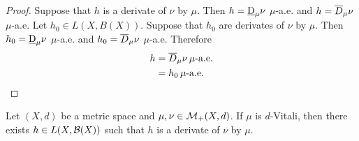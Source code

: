 \documentclass{book}
\begin{document}
	\begin{proof}
		Suppose that $h$ is a derivate of $\nu$ by $\mu$. Then $h = \underbar{D}_{\mu}\nu$ $\mu$-a.e. and $h = \overline{D}_{\mu}\nu$ $\mu$-a.e. Let $h_0 \in L(X, B(X))$. Suppose that $h_0$ are derivates of $\nu$ by $\mu$. Then $h_0 = \underbar{D}_{\mu}\nu$ $\mu$-a.e. and $h_0 = \overline{D}_{\mu}\nu$ $\mu$-a.e. Therefore
		\begin{align*}
			h
			& = \overline{D}_{\mu}\nu \, \mu \text{-a.e.} \\
			& = h_0 \, \mu \text{-a.e.}
		\end{align*}
	\end{proof}
	
	\begin{ex} 
		Let $(X, d)$ be a metric space and $\mu, \nu \in \mathcal{M}_+(X, d)$. If $\mu$ is $d$-Vitali, then there exists $h \in L(X, \mathcal{B}(X))$ such that $h$ is a derivate of $\nu$ by $\mu$.
	\end{ex}
\end{document}

